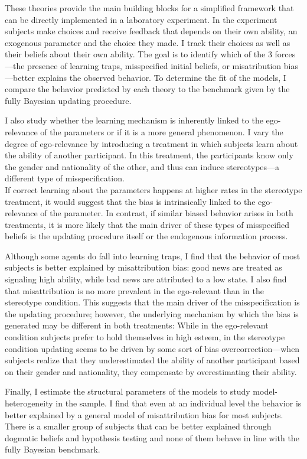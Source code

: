 \documentclass[
  12pt,
]{article}
\begin{document}
These theories provide the main building blocks for a simplified
framework that can be directly implemented in a laboratory experiment.
In the experiment subjects make choices and receive feedback that
depends on their own ability, an exogenous parameter and the choice they
made. I track their choices as well as their beliefs about their own
ability. The goal is to identify which of the 3 forces---the presence of
learning traps, misspecified initial beliefs, or misatribution
bias---better explains the observed behavior. To determine the fit of
the models, I compare the behavior predicted by each theory to the
benchmark given by the fully Bayesian updating procedure.

I also study whether the learning mechanism is inherently linked to the
ego-relevance of the parameters or if it is a more general phenomenon. I
vary the degree of ego-relevance by introducing a treatment in which
subjects learn about the ability of another participant. In this
treatment, the participants know only the gender and nationality of the
other, and thus can induce stereotypes---a different type of
misspecification.\\
If correct learning about the parameters happens at higher rates in the
stereotype treatment, it would suggest that the bias is intrinsically
linked to the ego-relevance of the parameter. In contrast, if similar
biased behavior arises in both treatments, it is more likely that the
main driver of these types of misspecified beliefs is the updating
procedure itself or the endogenous information process.

Although some agents do fall into learning traps, I find that the
behavior of most subjects is better explained by misattribution bias:
good news are treated as signaling high ability, while bad news are
attributed to a low state. I also find that misattribution is no more
prevalent in the ego-relevant than in the stereotype condition. This
suggests that the main driver of the misspecification is the updating
procedure; however, the underlying mechanism by which the bias is
generated may be different in both treatments: While in the ego-relevant
condition subjects prefer to hold themselves in high esteem, in the
stereotype condition updating seems to be driven by some sort of bias
overcorrection---when subjects realize that they underestimated the
ability of another participant based on their gender and nationality,
they compensate by overestimating their ability.

Finally, I estimate the structural parameters of the models to study
model-heterogeneity in the sample. I find that even at an individual
level the behavior is better explained by a general model of
misattribution bias for most subjects. There is a smaller group of
subjects that can be better explained through dogmatic beliefs and
hypothesis testing and none of them behave in line with the fully
Bayesian benchmark.
\end{document}
